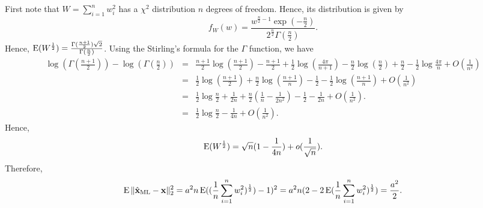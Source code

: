 \documentclass[onecolumn]{IEEEtran}
\newcommand{\xvh}{\hat{\xv}}
\begin{document}
 



\appendix

First note that $W= \sum_{i=1}^n w_i^2$ has a $\chi^2$ distribution $n$ degrees of freedom. Hence, its distribution is given by
\[
f_W(w) = \frac{w^{\frac{n}{2}-1} \exp(-\frac{n}{2}) }{2^{\frac{n}{2}} \Gamma (\frac{n}{2})}.  
\]
Hence, $\operatorname{E} (W^{\frac{1}{2}}) = \frac{\Gamma (\frac{n+1}{2}) \sqrt{2}}{\Gamma (\frac{n}{2})}$. Using the Stirling's formula for the $\Gamma$ function, we have
\begin{eqnarray*}
\log(\Gamma (\frac{n+1}{2}))- \log(\Gamma (\frac{n}{2})) &=& \frac{n+1}{2} \log (\frac{n+1}{2}) - \frac{n+1}{2} + \frac{1}{2} \log(\frac{4 \pi }{n+1})- \frac{n}{2} \log (\frac{n}{2}) + \frac{n}{2} - \frac{1}{2} \log \frac{4 \pi}{n} + O(\frac{1}{n^2}) \nonumber \\
&=& \frac{1}{2}\log (\frac{n+1}{2}) + \frac{n}{2}\log (\frac{n+1}{n})- \frac{1}{2} -\frac{1}{2} \log(\frac{n+1}{n}) + O(\frac{1}{n^2}) \nonumber \\
&=& \frac{1}{2} \log \frac{n}{2} + \frac{1}{2n} + \frac{n}{2} (\frac{1}{n} - \frac{1}{2 n^2}) - \frac{1}{2} - \frac{1}{2n} +O(\frac{1}{n^2}).  \nonumber \\
&=&   \frac{1}{2} \log \frac{n}{2} -\frac{1}{4n} + O(\frac{1}{n^2}). 
\end{eqnarray*}
Hence,
\begin{eqnarray*}
\operatorname{E} (W^{\frac{1}{2}}) = \sqrt{n} (1- \frac{1}{4n}) + o(\frac{1}{\sqrt{n}}). 
\end{eqnarray*}
Therefore,
\begin{eqnarray*}
\E \|\xvh_{\rm ML}- \xv\|_2^2= a^2 n \E ( ({1\over n}\sum_{i=1}^nw_i^2)^{1\over 2})-1)^2 = a^2 n (2- 2 \E  ({1\over n}\sum_{i=1}^nw_i^2)^{1\over 2}) = \frac{a^2}{2}. 
\end{eqnarray*}
\end{document}
